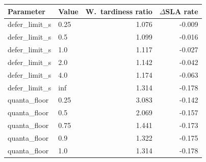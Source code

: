 \begin{tabular}{llrr}
\toprule
Parameter & Value & W.\ tardiness ratio & $\Delta$SLA rate \\
\midrule
defer\_limit\_s & 0.25 & 1.076 & -0.009 \\
defer\_limit\_s & 0.5 & 1.099 & -0.016 \\
defer\_limit\_s & 1.0 & 1.117 & -0.027 \\
defer\_limit\_s & 2.0 & 1.142 & -0.042 \\
defer\_limit\_s & 4.0 & 1.174 & -0.063 \\
defer\_limit\_s & inf & 1.314 & -0.178 \\
quanta\_floor & 0.25 & 3.083 & -0.142 \\
quanta\_floor & 0.5 & 2.069 & -0.157 \\
quanta\_floor & 0.75 & 1.441 & -0.173 \\
quanta\_floor & 0.9 & 1.322 & -0.175 \\
quanta\_floor & 1.0 & 1.314 & -0.178 \\
\bottomrule
\end{tabular}
